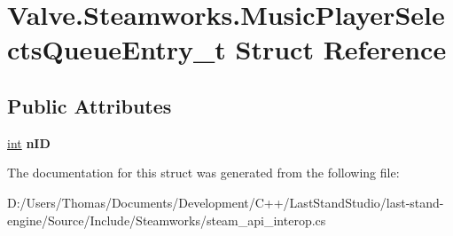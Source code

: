 \hypertarget{structValve_1_1Steamworks_1_1MusicPlayerSelectsQueueEntry__t}{}\section{Valve.\+Steamworks.\+Music\+Player\+Selects\+Queue\+Entry\+\_\+t Struct Reference}
\label{structValve_1_1Steamworks_1_1MusicPlayerSelectsQueueEntry__t}
\subsection*{Public Attributes}
\begin{DoxyCompactItemize}
\item 
\hypertarget{structValve_1_1Steamworks_1_1MusicPlayerSelectsQueueEntry__t_afe3e135de4773f5de8446486f67c9d2b}{}\hyperlink{SDL__thread_8h_a6a64f9be4433e4de6e2f2f548cf3c08e}{int} {\bfseries n\+I\+D}\label{structValve_1_1Steamworks_1_1MusicPlayerSelectsQueueEntry__t_afe3e135de4773f5de8446486f67c9d2b}

\end{DoxyCompactItemize}


The documentation for this struct was generated from the following file\+:\begin{DoxyCompactItemize}
\item 
D\+:/\+Users/\+Thomas/\+Documents/\+Development/\+C++/\+Last\+Stand\+Studio/last-\/stand-\/engine/\+Source/\+Include/\+Steamworks/steam\+\_\+api\+\_\+interop.\+cs\end{DoxyCompactItemize}
